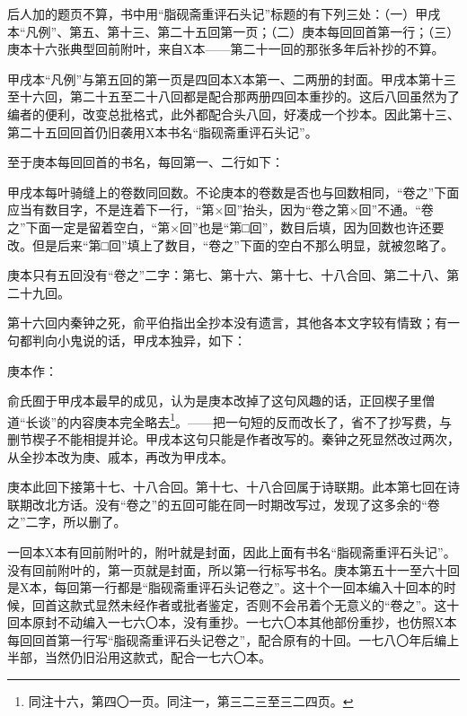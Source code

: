 \par 后人加的题页不算，书中用“脂砚斋重评石头记”标题的有下列三处：（一）甲戌本“凡例”、第五、第十三、第二十五回第一页；（二）庚本每回回首第一行；（三）庚本十六张典型回前附叶，来自X本——第二十一回的那张多年后补抄的不算。
\par 甲戌本“凡例”与第五回的第一页是四回本X本第一、二两册的封面。甲戌本第十三至十六回，第二十五至二十八回都是配合那两册四回本重抄的。这后八回虽然为了编者的便利，改变总批格式，此外都配合头八回，好凑成一个抄本。因此第十三、第二十五回回首仍旧袭用X本书名“脂砚斋重评石头记”。
\par 至于庚本每回回首的书名，每回第一、二行如下：
\par 甲戌本每叶骑缝上的卷数同回数。不论庚本的卷数是否也与回数相同，“卷之”下面应当有数目字，不是连着下一行，“第×回”抬头，因为“卷之第×回”不通。“卷之”下面一定是留着空白，“第×回”也是“第□回”，数目后填，因为回数也许还要改。但是后来“第□回”填上了数目，“卷之”下面的空白不那么明显，就被忽略了。
\par 庚本只有五回没有“卷之”二字：第七、第十六、第十七、十八合回、第二十八、第二十九回。
\par 第十六回内秦钟之死，俞平伯指出全抄本没有遗言，其他各本文字较有情致；有一句都判向小鬼说的话，甲戌本独异，如下：
\par 庚本作：
\par 俞氏囿于甲戌本最早的成见，认为是庚本改掉了这句风趣的话，正回楔子里僧道“长谈”的内容庚本完全略去\footnote{同注十六，第四〇一页。同注一，第三二三至三二四页。}。——把一句短的反而改长了，省不了抄写费，与删节楔子不能相提并论。甲戌本这句只能是作者改写的。秦钟之死显然改过两次，从全抄本改为庚、戚本，再改为甲戌本。
\par 庚本此回下接第十七、十八合回。第十七、十八合回属于诗联期。此本第七回在诗联期改北方话。没有“卷之”的五回可能在同一时期改写过，发现了这多余的“卷之”二字，所以删了。
\par 一回本X本有回前附叶的，附叶就是封面，因此上面有书名“脂砚斋重评石头记”。没有回前附叶的，第一页就是封面，所以第一行标写书名。庚本第五十一至六十回是X本，每回第一行都是“脂砚斋重评石头记卷之”。这十个一回本编入十回本的时候，回首这款式显然未经作者或批者鉴定，否则不会吊着个无意义的“卷之”。这十回本原封不动编入一七六〇本，没有重抄。一七六〇本其他部份重抄，也仿照X本每回回首第一行写“脂砚斋重评石头记卷之”，配合原有的十回。一七八〇年后编上半部，当然仍旧沿用这款式，配合一七六〇本。
